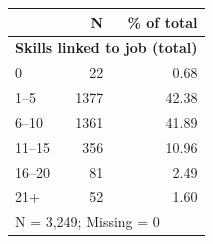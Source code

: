 \begin{tabular}{lrr}


\toprule


 & N & \% of total \\


\midrule


\multicolumn{3}{l}{\textbf{Skills linked to job (total)}}\\ 


\midrule
0           &          22&        0.68\\
1–5         &        1377&       42.38\\
6–10        &        1361&       41.89\\
11–15       &         356&       10.96\\
16–20       &          81&        2.49\\
21+         &          52&        1.60\\
\midrule


\multicolumn{3}{l}{\footnotesize N =        3,249; Missing =            0}\\


\bottomrule


\end{tabular}
